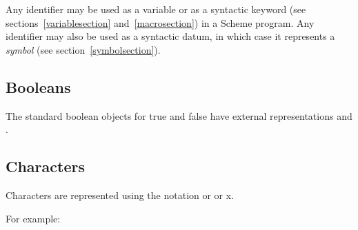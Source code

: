 Any identifier may be used as a variable or as a
syntactic keyword (see
sections~\ref{variablesection} and~\ref{macrosection}) in a Scheme
program.
Any identifier may also be used as a syntactic datum, in which case it
represents a \textit{symbol} (see section~\ref{symbolsection}).

\subsection{Booleans}

The standard boolean objects for true and false have external representations
\schtrue{} and \schfalse.

\subsection{Characters}

Characters are represented using the notation
\sharpsign\backwhack{}\index{#\@\texttt{\sharpsign\backwhack}} or
\sharpsign\backwhack{} or
\sharpsign\backwhack{}x.

For example:

